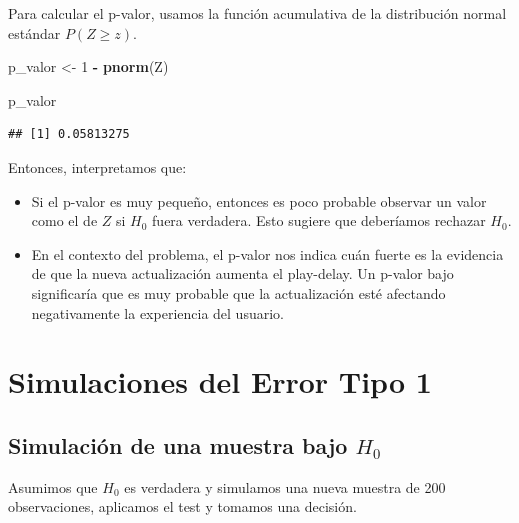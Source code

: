 \documentclass[
]{article}
\newenvironment{Shaded}{\begin{snugshade}}{\end{snugshade}}
\newcommand{\DecValTok}[1]{\textcolor[rgb]{0.00,0.00,0.81}{#1}}
\newcommand{\FunctionTok}[1]{\textcolor[rgb]{0.13,0.29,0.53}{\textbf{#1}}}
\newcommand{\NormalTok}[1]{#1}
\newcommand{\OtherTok}[1]{\textcolor[rgb]{0.56,0.35,0.01}{#1}}
\newcommand{\SpecialCharTok}[1]{\textcolor[rgb]{0.81,0.36,0.00}{\textbf{#1}}}
\providecommand{\tightlist}{%
  \setlength{\itemsep}{0pt}\setlength{\parskip}{0pt}}
\begin{document}
Para calcular el p-valor, usamos la función acumulativa de la
distribución normal estándar \(P(Z \geq z)\).

\begin{Shaded}
\begin{Highlighting}[]
\NormalTok{p\_valor }\OtherTok{\textless{}{-}} \DecValTok{1} \SpecialCharTok{{-}} \FunctionTok{pnorm}\NormalTok{(Z)}

\NormalTok{p\_valor}
\end{Highlighting}
\end{Shaded}

\begin{verbatim}
## [1] 0.05813275
\end{verbatim}

Entonces, interpretamos que:

\begin{itemize}
\tightlist
\item
  Si el p-valor es muy pequeño, entonces es poco probable observar un
  valor como el de \(Z\) si \(H_0\) fuera verdadera. Esto sugiere que
  deberíamos rechazar \(H_0\).
\item
  En el contexto del problema, el p-valor nos indica cuán fuerte es la
  evidencia de que la nueva actualización aumenta el play-delay. Un
  p-valor bajo significaría que es muy probable que la actualización
  esté afectando negativamente la experiencia del usuario.
\end{itemize}

\section{Simulaciones del Error Tipo
1}\label{simulaciones-del-error-tipo-1}

\subsection{\texorpdfstring{Simulación de una muestra bajo
\(H_0\)}{Simulación de una muestra bajo H\_0}}\label{simulaciuxf3n-de-una-muestra-bajo-h_0}

Asumimos que \(H_0\) es verdadera y simulamos una nueva muestra de 200
observaciones, aplicamos el test y tomamos una decisión.
\end{document}
